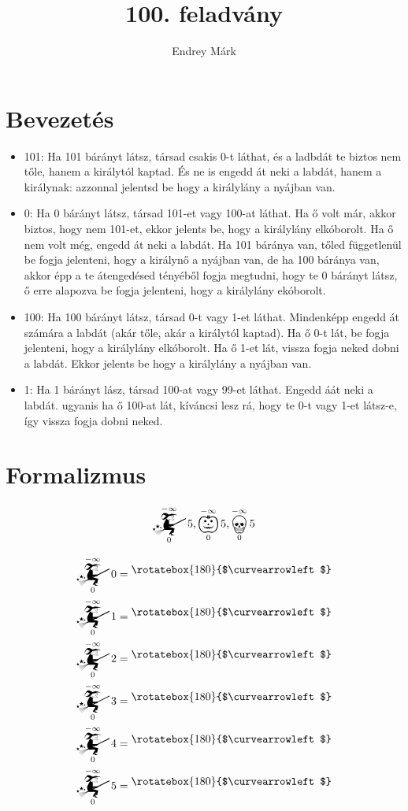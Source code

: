 \documentclass{article}
\title{100. feladvány}
\author{Endrey Márk}
\newcommand{\nothing}{\text{\raisebox{0.4em}{\rotatebox{180}{$\curvearrowleft$}}}}%
\newcommand{\mainfun}[3]{\mathwitch_{#1}^{#2}#3}
\newcommand{\yesmainfun}[3]{\bigpumpkin_{#1}^{#2}#3}
\newcommand{\nomainfun}[3]{\bigskull_{#1}^{#2}#3}
\begin{document}
	\maketitle

	\section{Bevezetés}

	\begin{itemize}
		\item 101: Ha 101 bárányt látsz, társad csakis 0-t láthat, és a ladbdát te biztos nem tőle, hanem a királytól kaptad. És ne is engedd át neki a labdát, hanem a királynak: azzonnal jelentsd be hogy a királylány a nyájban van.
		\item 0: Ha   0 bárányt látsz, társad 101-et vagy 100-at láthat. Ha ő volt már, akkor biztos, hogy nem 101-et, ekkor jelents be, hogy a királylány elkóborolt. Ha ő nem volt még, engedd át neki a labdát. Ha 101 báránya van, tőled függetlenül be fogja jelenteni, hogy a királynő a nyájban van, de ha 100 báránya van, akkor  épp a te átengedésed tényéből fogja megtudni, hogy te 0 bárányt látsz, ő erre alapozva be fogja jelenteni, hogy a királylány ekóborolt.
		\item 100: Ha 100 bárányt látsz, társad 0-t vagy 1-et láthat. Mindenképp engedd át számára a labdát (akár tőle, akár a királytól kaptad). Ha ő 0-t lát, be fogja jelenteni, hogy a királylány elkóborolt. Ha ő 1-et lát, vissza fogja neked dobni a labdát. Ekkor jelents be hogy a királylány a nyájban van.
		\item 1: Ha 1 bárányt lász, társad 100-at vagy 99-et láthat. Engedd áát neki a labdát. ugyanis ha ő 100-at lát, kíváncsi lesz rá, hogy te 0-t vagy 1-et látsz-e, így vissza fogja dobni neked.
	\end{itemize}

	\section{Formalizmus}

	\[\mainfun0{-\infty}5, \yesmainfun0{-\infty}5, \nomainfun0{-\infty}5\]

	\begin{align*}
		\mainfun0{-\infty}0 &= \nothing \\
		\mainfun0{-\infty}1 &= \nothing \\
		\mainfun0{-\infty}2 &= \nothing \\
		\mainfun0{-\infty}3 &= \nothing \\
		\mainfun0{-\infty}4 &= \nothing \\
		\mainfun0{-\infty}5 &= \nothing
	\end{align*}
\end{document}
